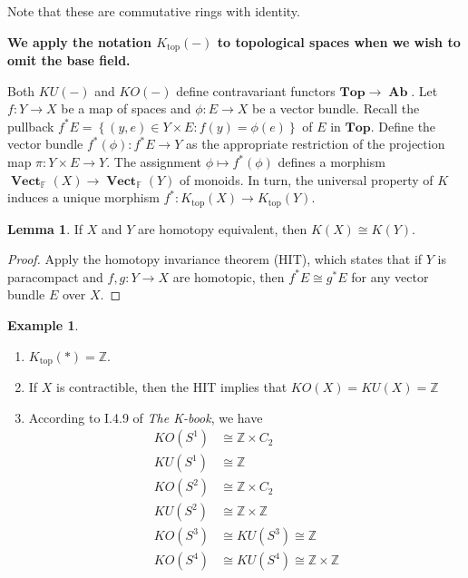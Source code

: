 \documentclass[10pt,letterpaper,cm]{nupset}
\theoremstyle{definition}
\newtheorem{exmp}[definition]{Example}
\theoremstyle{theorem}
\newtheorem{lemma}[definition]{Lemma}
\theoremstyle{remark}
\newcommand{\F}{\mathbb F}
\newcommand{\Z}{\mathbb Z}
\newcommand{\1}{\mathbf{1}}
\newcommand{\0}{\vec 0}
\DeclareMathOperator{\vect}{\mathbf{Vect}}
\DeclareMathOperator{\topp}{\mathrm{top}}
\DeclareMathOperator{\Ab}{\mathbf{Ab}}
\begin{document}
Note that these are commutative rings with identity. 

\smallskip

\begin{center}
 \textbf{We apply the notation $K_{\topp}(-)$ to topological spaces when we wish to omit the base field.}
\end{center}

\medskip

Both $KU(-)$ and $KO(-)$ define contravariant functors $\mathbf{Top} \to \Ab$. Let $f: Y \to X$ be a map of spaces and $\phi : E \to X$ be a vector bundle. Recall the pullback $f^{\ast}E = \left\{(y, e) \in Y \times E : f(y) = \phi(e)\right\}$ of $E$ in $\mathbf{Top}$.  Define the vector bundle $f^{\ast}(\phi) : f^{\ast}E \to Y$ as the appropriate restriction of the projection map $\pi : Y \times E \to Y$. The assignment $\phi \mapsto f^{\ast}(\phi)$ defines a morphism  $\vect_{\F}(X) \to \vect_{\F}(Y)$ of monoids. In turn, the universal property of $K$ induces a unique morphism $f^{\ast}: K_{\topp}(X) \to K_{\topp}(Y)$.


\begin{lemma}
If $X$ and $Y$ are homotopy equivalent, then $K(X) \cong K(Y)$.
\end{lemma}
\begin{proof}
Apply the homotopy invariance theorem (HIT), which states that if $Y$ is paracompact and $f, g: Y \to X$ are homotopic, then $f^{\ast}E \cong g^{\ast}E$ for any vector bundle $E$ over $X$.
\end{proof}

\begin{exmp} $ $
\begin{enumerate}
\item $K_{\topp}(\ast) = \Z$.
\item If $X$ is contractible, then the HIT implies that $KO(X) = KU(X) = \Z$
\item According to I.4.9 of \textit{The K-book}, we have
\begin{align*}
KO(S^1) & \cong \Z \times C_2 
\\ KU(S^1) &  \cong \Z \\
KO(S^2) & \cong \Z \times C_2  
\\  KU(S^2) & \cong \Z \times \Z
\\ KO(S^3) & \cong KU(S^3) \cong \Z 
\\ KO(S^4) & \cong KU(S^4) \cong \Z \times \Z
\end{align*}
\end{enumerate}
\end{exmp}
\end{document}
